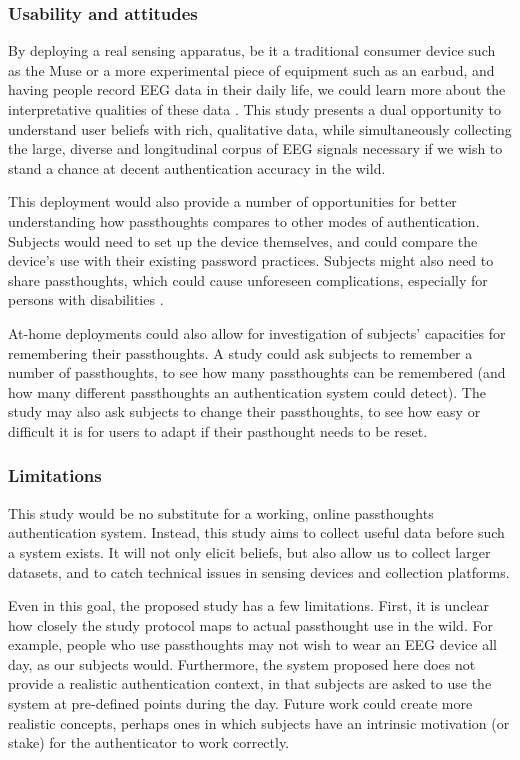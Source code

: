\documentclass[sigconf]{acmart}
\begin{document}
\subsubsection{Usability and attitudes}
\label{sec:org88bd963}

By deploying a real sensing apparatus, be it a traditional consumer device such
as the Muse \cite{Mihajlovic2015} or a more experimental piece of equipment such
as an earbud, and having people record EEG data in their daily life, we could
learn more about the interpretative qualities of these data
\cite{NafusDawn;Sherman2014}. This study presents a dual opportunity to understand
user beliefs with rich, qualitative data, while simultaneously collecting the
large, diverse and longitudinal corpus of EEG signals necessary if we wish to
stand a chance at decent authentication accuracy in the wild.

This deployment would also provide a number of opportunities for better
understanding how passthoughts compares to other modes of authentication.
Subjects would need to set up the device themselves, and could compare the
device's use with their existing password practices. Subjects might also need to
share passthoughts, which could cause unforeseen complications, especially for
persons with disabilities \cite{Dosono2015}.

At-home deployments could also allow for investigation of subjects' capacities
for remembering their passthoughts. A study could ask subjects to remember a
number of passthoughts, to see how many passthoughts can be remembered (and how
many different passthoughts an authentication system could detect). The study
may also ask subjects to change their passthoughts, to see how easy or difficult
it is for users to adapt if their pasthought needs to be reset.

\subsubsection{Limitations}
\label{sec:org42611a6}

This study would be no substitute for a working, online passthoughts authentication system.
Instead, this study aims to collect useful data before such a system exists.
It will not only elicit beliefs, 
but also allow us to collect larger datasets, 
and to catch technical issues in sensing devices and collection platforms.

Even in this goal, the proposed study has a few limitations.
First, it is unclear how closely the study protocol maps to actual passthought use in the wild.
For example, people who use passthoughts may not wish to wear an EEG device all day, as our subjects would.
Furthermore, the system proposed here does not provide a realistic authentication context, in that subjects
are asked to use the system at pre-defined points during the day. 
Future work could create more realistic concepts, perhaps ones in which subjects have an intrinsic motivation (or stake) for the authenticator to work correctly.
\end{document}
